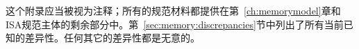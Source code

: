 这个附录应当被视为注释；所有的规范材料都提供在第~\ref{ch:memorymodel}章和ISA规范主体的剩余部分中。第~\ref{sec:memory:discrepancies}节中列出了所有当前已知的差异性。任何其它的差异性都是无意的。

\clearpage


\clearpage


\clearpage

